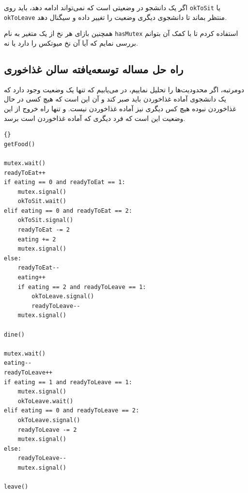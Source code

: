 \documentclass{book}
\newcommand{\clearemptydoublepage}{\newpage\cleardoublepage}
\begin{document}
    اگر یک دانشجو در وضعیتی است که نمی‌تواند ادامه دهد، باید روی {\tt okToSit} یا {\tt okToLeave} منتظر بماند تا دانشجوی دیگری 
    وضعیت را تغییر داده و سیگنال دهد. 

    همچنین بازای هر نخ از یک متغیر به نام {\tt hasMutex} استفاده کردم تا با کمک آن بتوانم بررسی نمایم که آیا آن نخ میوتکس را دارد یا نه. 

\clearemptydoublepage
\subsection{راه حل مساله توسعه‌یافته سالن غذاخوری}

    دومرتبه، اگر محدودیت‌ها را تحلیل نماییم، در می‌یابیم که تنها یک وضعیت وجود دارد که یک دانشجوی آماده غذاخوردن باید صبر کند و آن این است که 
    هیچ کسی در حال غذاخوردن نبوده هیچ کس دیگری نیز آماده غذاخوردن نیست. و تنها راه خروج از این وضعیت این است که فرد دیگری که آماده غذاخوردن است 
    برسد. 

\begin{latin}
\begin{lstlisting}[title=\rl{راه حل مساله توسعه‌یافته سالن غذاخوری}]{}
getFood()

mutex.wait()
readyToEat++
if eating == 0 and readyToEat == 1:
    mutex.signal()
    okToSit.wait()
elif eating == 0 and readyToEat == 2:
    okToSit.signal()
    readyToEat -= 2
    eating += 2
    mutex.signal()
else:
    readyToEat--
    eating++
    if eating == 2 and readyToLeave == 1:
        okToLeave.signal()
        readyToLeave--
    mutex.signal()

dine()

mutex.wait()
eating--
readyToLeave++
if eating == 1 and readyToLeave == 1:
    mutex.signal()
    okToLeave.wait()
elif eating == 0 and readyToLeave == 2:
    okToLeave.signal()
    readyToLeave -= 2
    mutex.signal()
else:
    readyToLeave--
    mutex.signal()

leave()
\end{lstlisting}
\end{latin}
\end{document}
